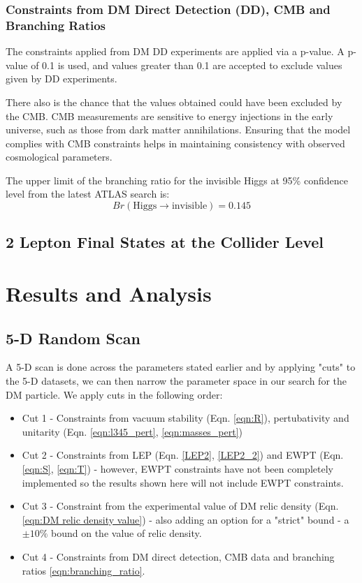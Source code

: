 \documentclass[12pt]{article}
\begin{document}
\subsubsection{Constraints from DM Direct Detection (DD), CMB and Branching Ratios}
The constraints applied from DM DD experiments are applied via a p-value. A p-value of 0.1 is used, and values greater than 0.1 are accepted to exclude values given by DD experiments.

There also is the chance that the values obtained could have been excluded by the CMB. CMB measurements are sensitive to energy injections in the early universe, such as those from dark matter annihilations. Ensuring that the model complies with CMB constraints helps in maintaining consistency with observed cosmological parameters. 

The upper limit of the branching ratio for the invisible Higgs at 95\% confidence level from the latest ATLAS search is\cite{ATLAS:2022yvh}:
\begin{equation}
    Br(\text{Higgs} \rightarrow \text{invisible}) = 0.145
    \label{eqn:branching_ratio}
\end{equation}
\subsection{2 Lepton Final States at the Collider Level}

\section{Results and Analysis}
\label{sec:results}
\subsection{5-D Random Scan}
\label{5-D scan}
A 5-D scan is done across the parameters stated earlier and by applying "cuts" to the 5-D datasets, we can then narrow the parameter space in our search for the DM particle.
We apply cuts in the following order:
\begin{itemize}
    \item Cut 1 - Constraints from vacuum stability (Eqn. \ref{eqn:R}), pertubativity and unitarity (Eqn. \ref{eqn:l345_pert}, \ref{eqn:masses_pert}) 
    \item Cut 2 - Constraints from LEP (Eqn. \ref{LEP2}, \ref{LEP2_2}) and EWPT (Eqn. \ref{eqn:S}, \ref{eqn:T}) - however, EWPT constraints have not been completely implemented so the results shown here will not include EWPT constraints.
    \item Cut 3 - Constraint from the experimental value of DM relic density (Eqn. \ref{eqn:DM relic density value}) - also adding an option for a "strict" bound - a $\pm 10 \%$ bound on the value of relic density.
    \item Cut 4 - Constraints from DM direct detection, CMB data and branching ratios \ref{eqn:branching_ratio}.
\end{itemize}
\end{document}
